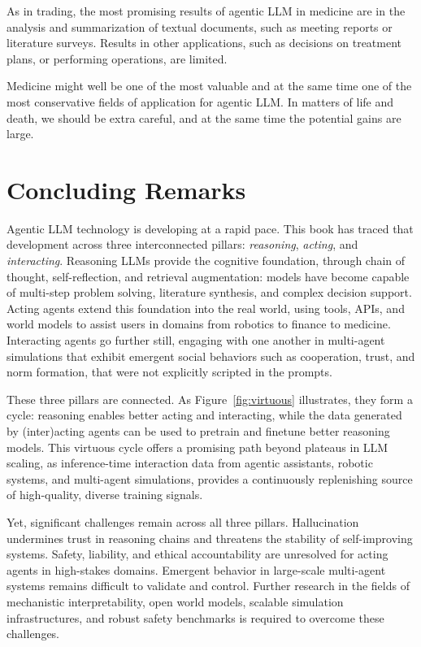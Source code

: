 As in trading, the most promising results of agentic LLM in medicine are in the analysis and summarization of textual documents, such as meeting reports or literature surveys. Results in other applications, such as decisions on treatment plans, or performing operations, are limited. 

Medicine might well be one of the most valuable and at the same time one of the most conservative fields of application for agentic LLM. In matters of life and death, we should be extra  careful, and at the same time the potential gains are large.



\section{Concluding Remarks}

Agentic LLM technology is developing at a rapid pace. This book has 
traced that development across three interconnected pillars: \emph{reasoning}, 
\emph{acting}, and \emph{interacting}. Reasoning LLMs provide the cognitive 
foundation, through chain of thought, self-reflection, and retrieval 
augmentation: models have become capable of multi-step problem solving, 
literature synthesis, and complex decision support. Acting agents extend this 
foundation into the real world, using tools, APIs, and world models to assist 
users in domains from robotics to finance to medicine. Interacting agents go 
further still, engaging with one another in multi-agent simulations that 
exhibit emergent social behaviors such as cooperation, trust, and norm formation, that 
were not explicitly scripted in the prompts.

These three pillars are connected. As Figure~\ref{fig:virtuous} 
illustrates, they form a  cycle: reasoning enables better acting and 
interacting, while the data generated by (inter)acting  agents can be used to pretrain and finetune better reasoning models. This virtuous cycle 
offers a promising path beyond plateaus in LLM scaling, as 
inference-time interaction data from agentic assistants, robotic systems, and 
multi-agent simulations, provides a continuously replenishing source of 
high-quality, diverse training signals.

Yet, significant challenges remain across all three pillars. Hallucination 
undermines trust in reasoning chains and threatens the stability of 
self-improving systems. Safety, liability, and ethical accountability are 
unresolved for acting agents in high-stakes domains. Emergent behavior in 
large-scale multi-agent systems remains difficult to validate and control. 
Further research in the fields of mechanistic interpretability, open world models, scalable simulation infrastructures, and robust safety 
benchmarks is required to overcome these challenges.
 
